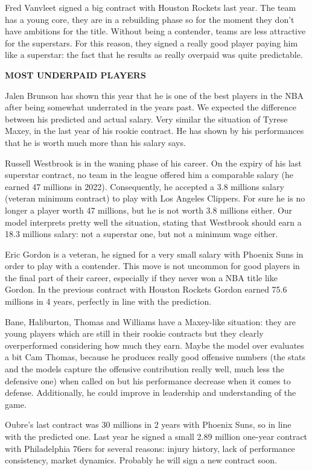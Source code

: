 \documentclass[
]{article}
\begin{document}
Fred Vanvleet signed a big contract with Houston Rockets last year. The
team has a young core, they are in a rebuilding phase so for the moment
they don't have ambitions for the title. Without being a contender,
teams are less attractive for the superstars. For this reason, they
signed a really good player paying him like a superstar: the fact that
he results as really overpaid was quite predictable.

\textbf{MOST UNDERPAID PLAYERS}

Jalen Brunson has shown this year that he is one of the best players in
the NBA after being somewhat underrated in the years past. We expected
the difference between his predicted and actual salary. Very similar the
situation of Tyrese Maxey, in the last year of his rookie contract. He
has shown by his performances that he is worth much more than his salary
says.

Russell Westbrook is in the waning phase of his career. On the expiry of
his last superstar contract, no team in the league offered him a
comparable salary (he earned 47 millions in 2022). Consequently, he
accepted a 3.8 millions salary (veteran minimum contract) to play with
Los Angeles Clippers. For sure he is no longer a player worth 47
millions, but he is not worth 3.8 millions either. Our model interprets
pretty well the situation, stating that Westbrook should earn a 18.3
millions salary: not a superstar one, but not a minimum wage either.

Eric Gordon is a veteran, he signed for a very small salary with Phoenix
Suns in order to play with a contender. This move is not uncommon for
good players in the final part of their career, especially if they never
won a NBA title like Gordon. In the previous contract with Houston
Rockets Gordon earned 75.6 millions in 4 years, perfectly in line with
the prediction.

Bane, Haliburton, Thomas and Williams have a Maxey-like situation: they
are young players which are still in their rookie contracts but they
clearly overperformed considering how much they earn. Maybe the model
over evaluates a bit Cam Thomas, because he produces really good
offensive numbers (the stats and the models capture the offensive
contribution really well, much less the defensive one) when called on
but his performance decrease when it comes to defense. Additionally, he
could improve in leadership and understanding of the game.

Oubre's last contract was 30 millions in 2 years with Phoenix Suns, so
in line with the predicted one. Last year he signed a small 2.89 million
one-year contract with Philadelphia 76ers for several reasons: injury
history, lack of performance consistency, market dynamics. Probably he
will sign a new contract soon.
\end{document}
